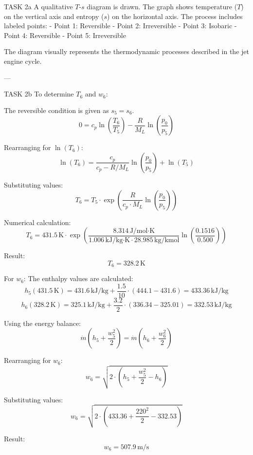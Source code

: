 TASK 2a  
A qualitative \( T \)-\( s \) diagram is drawn. The graph shows temperature (\( T \)) on the vertical axis and entropy (\( s \)) on the horizontal axis. The process includes labeled points:  
- Point 1: Reversible  
- Point 2: Irreversible  
- Point 3: Isobaric  
- Point 4: Reversible  
- Point 5: Irreversible  

The diagram visually represents the thermodynamic processes described in the jet engine cycle.

---

TASK 2b  
To determine \( T_6 \) and \( w_6 \):  

The reversible condition is given as \( s_5 = s_6 \).  
\[
0 = c_p \ln \left( \frac{T_6}{T_5} \right) - \frac{R}{M_L} \ln \left( \frac{p_0}{p_5} \right)
\]

Rearranging for \( \ln(T_6) \):  
\[
\ln(T_6) = \frac{c_p}{c_p - R/M_L} \ln \left( \frac{p_0}{p_5} \right) + \ln(T_5)
\]

Substituting values:  
\[
T_6 = T_5 \cdot \exp \left( \frac{R}{c_p \cdot M_L} \ln \left( \frac{p_0}{p_5} \right) \right)
\]

Numerical calculation:  
\[
T_6 = 431.5 \, \text{K} \cdot \exp \left( \frac{8.314 \, \text{J/mol·K}}{1.006 \, \text{kJ/kg·K} \cdot 28.985 \, \text{kg/kmol}} \ln \left( \frac{0.1516}{0.500} \right) \right)
\]

Result:  
\[
T_6 = 328.2 \, \text{K}
\]

For \( w_6 \):  
The enthalpy values are calculated:  
\[
h_5(431.5 \, \text{K}) = 431.6 \, \text{kJ/kg} + \frac{1.5}{10} \cdot (444.1 - 431.6) = 433.36 \, \text{kJ/kg}
\]
\[
h_6(328.2 \, \text{K}) = 325.1 \, \text{kJ/kg} + \frac{3.2}{2} \cdot (336.34 - 325.01) = 332.53 \, \text{kJ/kg}
\]

Using the energy balance:  
\[
\dot{m} \left( h_5 + \frac{w_5^2}{2} \right) = \dot{m} \left( h_6 + \frac{w_6^2}{2} \right)
\]

Rearranging for \( w_6 \):  
\[
w_6 = \sqrt{2 \cdot \left( h_5 + \frac{w_5^2}{2} - h_6 \right)}
\]

Substituting values:  
\[
w_6 = \sqrt{2 \cdot \left( 433.36 + \frac{220^2}{2} - 332.53 \right)}
\]

Result:  
\[
w_6 = 507.9 \, \text{m/s}
\]